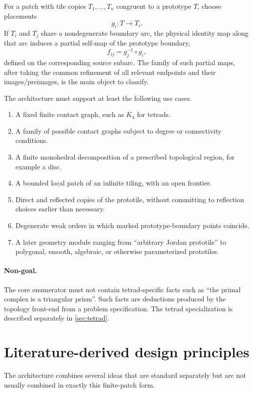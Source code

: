 \documentclass[11pt]{article}
\begin{document}
For a patch with tile copies $T_1,\dots,T_n$ congruent to a prototype $T$, choose placements
\[
  g_i:T\longrightarrow T_i.
\]
If $T_i$ and $T_j$ share a nondegenerate boundary arc, the physical identity map along that arc induces a partial self-map of the prototype boundary,
\[
  f_{ij}=g_j^{-1}\circ g_i,
\]
defined on the corresponding source subarc.  The family of such partial maps, after taking the common refinement of all relevant endpoints and their images/preimages, is the main object to classify.

The architecture must support at least the following use cases.
\begin{enumerate}[label=(U\arabic*)]
  \item A fixed finite contact graph, such as $K_4$ for tetrads.
  \item A family of possible contact graphs subject to degree or connectivity conditions.
  \item A finite monohedral decomposition of a prescribed topological region, for example a disc.
  \item A bounded local patch of an infinite tiling, with an open frontier.
  \item Direct and reflected copies of the prototile, without committing to reflection choices earlier than necessary.
  \item Degenerate weak orders in which marked prototype-boundary points coincide.
  \item A later geometry module ranging from ``arbitrary Jordan prototile'' to polygonal, smooth, algebraic, or otherwise parameterized prototiles.
\end{enumerate}

\paragraph{Non-goal.}
The core enumerator must not contain tetrad-specific facts such as ``the primal complex is a triangular prism''.  Such facts are deductions produced by the topology front-end from a problem specification.  The tetrad specialization is described separately in \cref{sec:tetrad}.

\section{Literature-derived design principles}

The architecture combines several ideas that are standard separately but are not usually combined in exactly this finite-patch form.
\end{document}

